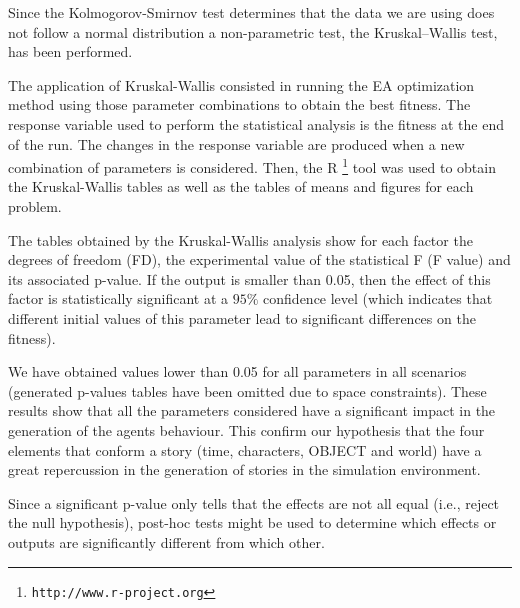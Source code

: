 \documentclass[runningheads,a4paper]{llncs}
\begin{document}
Since the Kolmogorov-Smirnov test determines that the data we are using
does not follow a normal distribution a non-parametric test, the Kruskal–Wallis test, has been
performed.  %

The application of Kruskal-Wallis consisted in running the EA optimization method using those parameter combinations to obtain the best fitness. 
The response variable used to perform the statistical analysis is the fitness at the end of the run. The changes in the response variable are produced when a new combination of parameters is considered. Then, the {R} \footnote{{\tt http://www.r-project.org}} tool was used to obtain the Kruskal-Wallis tables as well as the tables of means and figures for each problem.

The tables obtained by the Kruskal-Wallis analysis show for each factor the  degrees of freedom (FD), the experimental value of the statistical F (F value) and its associated p-value. If the output is smaller than 0.05, then the
effect of this factor is statistically significant at a $95\%$
confidence level (which indicates that different initial values of
this parameter lead to significant differences on the fitness).

We have obtained values lower than 0.05 for all parameters in all scenarios (generated p-values tables have been omitted due to space constraints). These results show that all the parameters considered have a significant
impact in the generation of the agents behaviour. This confirm our hypothesis that the four elements that conform a story (time, characters, OBJECT and world) have a great repercussion in the generation of stories in the simulation environment. %

Since a significant p-value only tells  that the effects are not all
equal (i.e., reject the null hypothesis), post-hoc tests might be used
to determine which effects or outputs are significantly different from
which other. %
\end{document}
